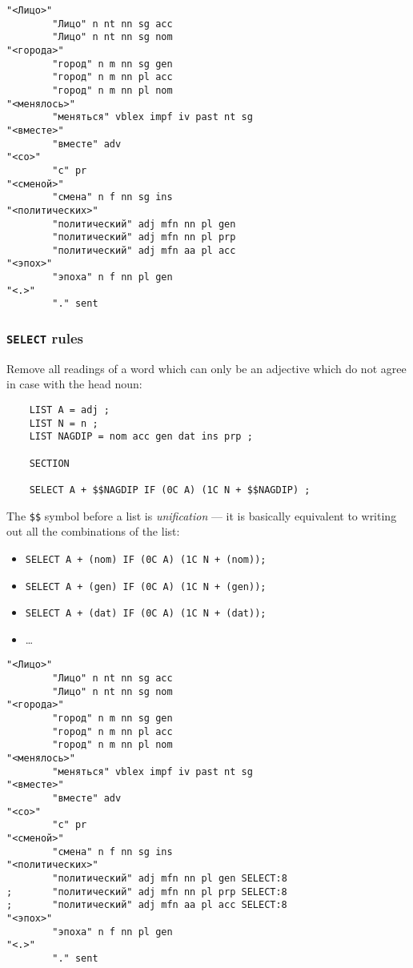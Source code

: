 \documentclass[10pt,xetex]{beamer} %
\begin{document}
\begin{frame}[fragile]

\begin{verbatim}
"<Лицо>"
        "Лицо" n nt nn sg acc
        "Лицо" n nt nn sg nom
"<города>"
        "город" n m nn sg gen
        "город" n m nn pl acc
        "город" n m nn pl nom
"<менялось>"
        "меняться" vblex impf iv past nt sg
"<вместе>"
        "вместе" adv
"<со>"
        "с" pr
"<сменой>"
        "смена" n f nn sg ins
"<политических>"
        "политический" adj mfn nn pl gen
        "политический" adj mfn nn pl prp
        "политический" adj mfn aa pl acc
"<эпох>"
        "эпоха" n f nn pl gen
"<.>"
        "." sent
\end{verbatim}

\end{frame}

\begin{frame}[fragile]
  \frametitle{\texttt{SELECT} rules}

Remove all readings of a word which can only be an adjective which do not agree in case with the head noun:

\begin{verbatim}
    LIST A = adj ;
    LIST N = n ;
    LIST NAGDIP = nom acc gen dat ins prp ;

    SECTION

    SELECT A + $$NAGDIP IF (0C A) (1C N + $$NAGDIP) ;
\end{verbatim}

The \texttt{\$\$} symbol before a list is \emph{unification} --- it is basically equivalent to writing
out all the combinations of the list:

\begin{itemize}
   \item \texttt{SELECT A + (nom) IF (0C A) (1C N + (nom));}
   \item \texttt{SELECT A + (gen) IF (0C A) (1C N + (gen));}
   \item \texttt{SELECT A + (dat) IF (0C A) (1C N + (dat));}
   \item \ldots
\end{itemize}

\end{frame}

\begin{frame}[fragile]

\begin{verbatim}
"<Лицо>"
        "Лицо" n nt nn sg acc
        "Лицо" n nt nn sg nom
"<города>"
        "город" n m nn sg gen
        "город" n m nn pl acc
        "город" n m nn pl nom
"<менялось>"
        "меняться" vblex impf iv past nt sg
"<вместе>"
        "вместе" adv
"<со>"
        "с" pr
"<сменой>"
        "смена" n f nn sg ins
"<политических>"
        "политический" adj mfn nn pl gen SELECT:8
;       "политический" adj mfn nn pl prp SELECT:8
;       "политический" adj mfn aa pl acc SELECT:8
"<эпох>"
        "эпоха" n f nn pl gen
"<.>"
        "." sent
\end{verbatim}

\end{frame}
\end{document}
